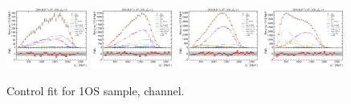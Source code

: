 \begin{figure}[htb]
    \includegraphics[width=0.24\textwidth]{./figs-fit-fit-results/ctrl-fit/lines_q2_slices/fit_result-lines_q2_idx1-D0-1os-el.pdf}
    \includegraphics[width=0.24\textwidth]{./figs-fit-fit-results/ctrl-fit/lines_q2_slices/fit_result-lines_q2_idx2-D0-1os-el.pdf}
    \includegraphics[width=0.24\textwidth]{./figs-fit-fit-results/ctrl-fit/lines_q2_slices/fit_result-lines_q2_idx3-D0-1os-el.pdf}
    \includegraphics[width=0.24\textwidth]{./figs-fit-fit-results/ctrl-fit/lines_q2_slices/fit_result-lines_q2_idx4-D0-1os-el.pdf}

    \caption{Control fit for 1OS sample, \Dz channel.}
    \label{fig:ctrl-1os-d0}
\end{figure}

